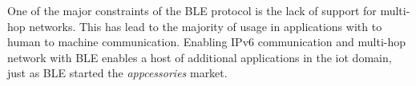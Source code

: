 One of the major constraints of the BLE protocol is the lack of support for multi-hop networks. This has lead to the majority of usage in applications with to human to machine communication. Enabling IPv6 communication and multi-hop network with BLE enables a host of additional applications in the \gls{iot} domain, just as BLE started the \emph{appcessories} market.

